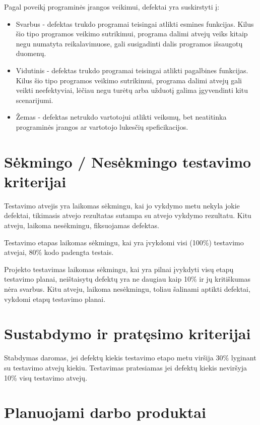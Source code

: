 \documentclass{VUMIFPSkursinis}
\begin{document}
    Pagal poveikį programinės įrangos veikimui, defektai yra suskirstyti į:

    \begin{itemize}
    	\item Svarbus - defektas trukdo programai teisingai atlikti esmines funkcijas. Kilus šio tipo programos
    	veikimo sutrikimui, programa dalimi atvejų veiks kitaip negu numatyta reikalavimuose,
    	gali susigadinti dalis programos išsaugotų duomenų.
    	\item Vidutinis - defektas trukdo programai teisingai atlikti pagalbines funkcijas. Kilus šio tipo
    	programos veikimo sutrikimui, programa dalimi atvejų gali veikti neefektyviai, lėčiau negu turėtų arba užduotį galima įgyvendinti kitu scenarijumi.
      \item Žemas - defektas netrukdo vartotojui atlikti veiksmų, bet neatitinka programinės įrangos ar vartotojo lukesčių speficikacijos.
    \end{itemize}

    \section{Sėkmingo / Nesėkmingo testavimo kriterijai}

    Testavimo atvejis yra laikomas sėkmingu, kai jo vykdymo metu nekyla jokie defektai, tikimasis atvejo rezultatas sutampa su atvejo vykdymo rezultatu. 
    Kitu atveju, laikoma nesėkmingu, fiksuojamas defektas.

    Testavimo etapas laikomas sėkmingu, kai yra įvykdomi visi (100\%) testavimo atvejai, 80\% kodo padengta testais. 

    Projekto testavimas laikomas sėkmingu, kai yra pilnai įvykdyti visų etapų testavimo planai, neištaisytų defektų yra ne daugiau kaip 10\% ir jų kritiškumas nėra svarbus. 
    Kitu atveju, laikoma nesėkmingu, toliau šalinami aptikti defektai, vykdomi etapų testavimo planai.

    \section{Sustabdymo ir pratęsimo kriterijai}

    Stabdymas daromas, jei defektų kiekis testavimo etapo metu viršija 30\% lyginant su testavimo atvejų kiekiu. 
    Testavimas pratesiamas jei defektų kiekis neviršyja 10\% visų testavimo atvejų.

    \section{Planuojami darbo produktai}
\end{document}
